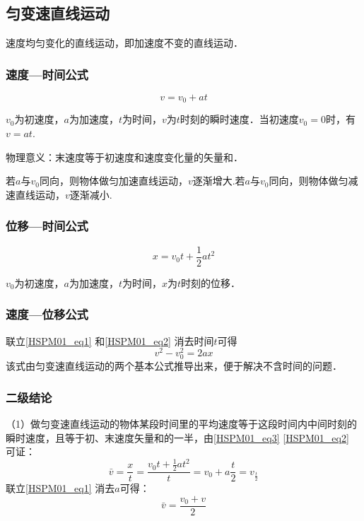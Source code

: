 \subsection{匀变速直线运动}
速度均匀变化的直线运动，即加速度不变的直线运动．
\subsubsection{速度—时间公式}
\begin{equation}\label{HSPM01_eq1}
v=v_0+at
\end{equation}

$v_0$为初速度，$a$为加速度，$t$为时间，$v$为$t$时刻的瞬时速度．当初速度$v_0=0$时，有$v=at$.

物理意义：末速度等于初速度和速度变化量的矢量和．

若$a$与$v_0$同向，则物体做匀加速直线运动，$v$逐渐增大.若$a$与$v_0$同向，则物体做匀减速直线运动，$v$逐渐减小.

\subsubsection{位移—时间公式}
\begin{equation}\label{HSPM01_eq2}
x=v_0 t+\frac12at^2
\end{equation}

$v_0$为初速度，$a$为加速度，$t$为时间，$x$为$t$时刻的位移．

\subsubsection{速度—位移公式}
联立\autoref{HSPM01_eq1} 和\autoref{HSPM01_eq2} 消去时间$t$可得
\begin{equation}\label{HSPM01_eq4}
v^2-v_0^2=2ax
\end{equation}
该式由匀变速直线运动的两个基本公式推导出来，便于解决不含时间的问题．

\subsubsection{二级结论}
（1）做匀变速直线运动的物体某段时间里的平均速度等于这段时间内中间时刻的瞬时速度，且等于初、末速度矢量和的一半，由\autoref{HSPM01_eq3} \autoref{HSPM01_eq2} 可证：
\begin{equation}
\bar v=\frac xt=\frac{v_0t+\frac 12at^2}{t}=v_0+a\frac t2=v_{\frac t2}
\end{equation}
联立\autoref{HSPM01_eq1} 消去$a$可得：
\begin{equation}
\bar v=\frac{v_0+v}{2}
\end{equation}

